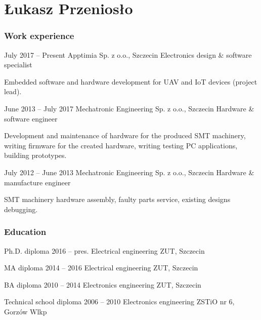\documentclass{tccv}
\begin{document}
\part{Łukasz Przeniosło}

\section{Work experience}

\begin{eventlist}

\item{July 2017 -- Present}
     {Apptimia Sp. z o.o., Szczecin}
     {Electronics design \& software specialist}
     
Embedded software and hardware development for UAV and IoT devices (project lead).

\item{June 2013 -- July 2017}
     {Mechatronic Engineering Sp. z o.o., Szczecin}
     {Hardware \& software engineer}
     
Development and maintenance of hardware for the produced SMT machinery, writing firmware for the created hardware, writing testing PC applications, building prototypes. 

\item{July 2012 -- June 2013}
     {Mechatronic Engineering Sp. z o.o., Szczecin}
     {Hardware \& manufacture engineer}

SMT machinery hardware assembly, faulty parts service, existing designs debugging. 

\end{eventlist}

\section{Education}

\begin{yearlist}

\item[Ph.D. diploma]{2016 -- pres.}
     {Electrical engineering}
     {ZUT, Szczecin}

\item[MA diploma]{2014 -- 2016}
     {Electrical engineering}
     {ZUT, Szczecin}

\item[BA diploma]{2010 -- 2014}
     {Electronics engineering}
     {ZUT, Szczecin}

\item[Technical school diploma]{2006 -- 2010}
     {Electronics engineering}
     {ZSTiO nr 6, Gorzów Wlkp}

\end{yearlist}
\end{document}
